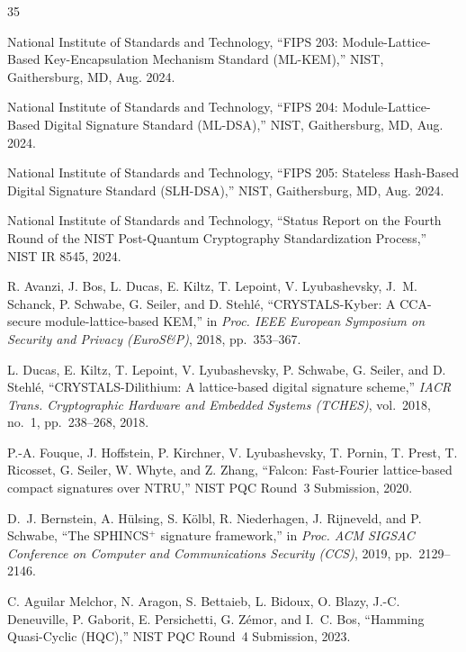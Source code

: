 \documentclass[conference]{IEEEtran}
\begin{document}

\begin{thebibliography}{35}

National Institute of Standards and Technology, ``FIPS 203: Module-Lattice-Based Key-Encapsulation Mechanism Standard (ML-KEM),'' NIST, Gaithersburg, MD, Aug. 2024.

National Institute of Standards and Technology, ``FIPS 204: Module-Lattice-Based Digital Signature Standard (ML-DSA),'' NIST, Gaithersburg, MD, Aug. 2024.

National Institute of Standards and Technology, ``FIPS 205: Stateless Hash-Based Digital Signature Standard (SLH-DSA),'' NIST, Gaithersburg, MD, Aug. 2024.

National Institute of Standards and Technology, ``Status Report on the Fourth Round of the NIST Post-Quantum Cryptography Standardization Process,'' NIST IR 8545, 2024.

R. Avanzi, J. Bos, L. Ducas, E. Kiltz, T. Lepoint, V. Lyubashevsky, J.~M. Schanck, P. Schwabe, G. Seiler, and D. Stehl{\'e}, ``CRYSTALS-Kyber: A CCA-secure module-lattice-based KEM,'' in \emph{Proc. IEEE European Symposium on Security and Privacy (EuroS\&P)}, 2018, pp.~353--367.

L. Ducas, E. Kiltz, T. Lepoint, V. Lyubashevsky, P. Schwabe, G. Seiler, and D. Stehl{\'e}, ``CRYSTALS-Dilithium: A lattice-based digital signature scheme,'' \emph{IACR Trans. Cryptographic Hardware and Embedded Systems (TCHES)}, vol.~2018, no.~1, pp.~238--268, 2018.

P.-A. Fouque, J. Hoffstein, P. Kirchner, V. Lyubashevsky, T. Pornin, T. Prest, T. Ricosset, G. Seiler, W. Whyte, and Z. Zhang, ``Falcon: Fast-Fourier lattice-based compact signatures over NTRU,'' NIST PQC Round~3 Submission, 2020.

D.~J. Bernstein, A. H{\"u}lsing, S. K{\"o}lbl, R. Niederhagen, J. Rijneveld, and P. Schwabe, ``The SPHINCS$^+$ signature framework,'' in \emph{Proc. ACM SIGSAC Conference on Computer and Communications Security (CCS)}, 2019, pp.~2129--2146.

C. Aguilar Melchor, N. Aragon, S. Bettaieb, L. Bidoux, O. Blazy, J.-C. Deneuville, P. Gaborit, E. Persichetti, G. Z{\'e}mor, and I.~C. Bos, ``Hamming Quasi-Cyclic (HQC),'' NIST PQC Round~4 Submission, 2023.


\end{thebibliography}
\end{document}
